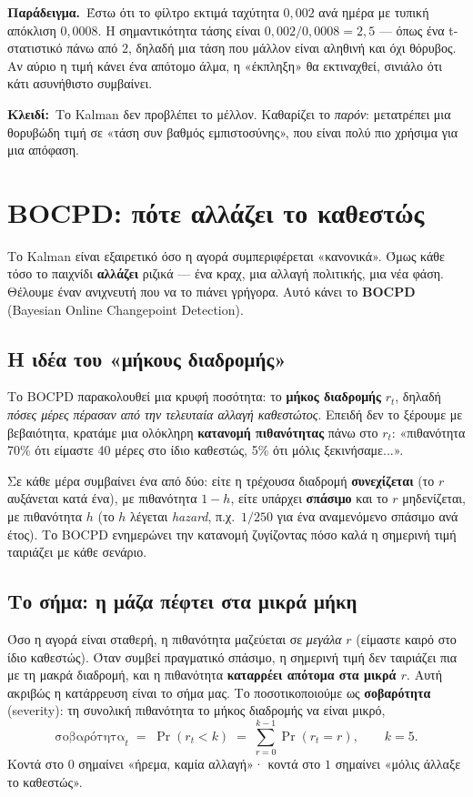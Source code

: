 \documentclass[11pt]{article}
\newcommand{\key}[1]{\par\medskip\noindent\colorbox{soft}{\parbox{\dimexpr\linewidth-2\fboxsep}{\textcolor{accent}{\textbf{Κλειδί:}}\ #1}}\par\medskip}
\newcommand{\ex}[1]{\par\smallskip\noindent\textbf{\textcolor{accent}{Παράδειγμα.}}\ #1\par\smallskip}
\begin{document}
\ex{Έστω ότι το φίλτρο εκτιμά ταχύτητα $0{,}002$ ανά ημέρα με τυπική απόκλιση $0{,}0008$. Η
σημαντικότητα τάσης είναι $0{,}002/0{,}0008 = 2{,}5$ --- όπως ένα t-στατιστικό πάνω από $2$, δηλαδή μια
τάση που μάλλον είναι αληθινή και όχι θόρυβος. Αν αύριο η τιμή κάνει ένα απότομο άλμα, η «έκπληξη» θα
εκτιναχθεί, σινιάλο ότι κάτι ασυνήθιστο συμβαίνει.}

\key{Το Kalman δεν προβλέπει το μέλλον. Καθαρίζει το \emph{παρόν}: μετατρέπει μια θορυβώδη τιμή σε
«τάση συν βαθμός εμπιστοσύνης», που είναι πολύ πιο χρήσιμα για μια απόφαση.}

\section{BOCPD: πότε αλλάζει το καθεστώς}

Το Kalman είναι εξαιρετικό όσο η αγορά συμπεριφέρεται «κανονικά». Όμως κάθε τόσο το παιχνίδι
\textbf{αλλάζει} ριζικά --- ένα κραχ, μια αλλαγή πολιτικής, μια νέα φάση. Θέλουμε έναν ανιχνευτή που να
το πιάνει γρήγορα. Αυτό κάνει το \textbf{BOCPD} (Bayesian Online Changepoint Detection).

\subsection{Η ιδέα του «μήκους διαδρομής»}
Το BOCPD παρακολουθεί μια κρυφή ποσότητα: το \textbf{μήκος διαδρομής} $r_t$, δηλαδή \emph{πόσες μέρες
πέρασαν από την τελευταία αλλαγή καθεστώτος}. Επειδή δεν το ξέρουμε με βεβαιότητα, κρατάμε μια ολόκληρη
\textbf{κατανομή πιθανότητας} πάνω στο $r_t$: «πιθανότητα 70\% ότι είμαστε 40 μέρες στο ίδιο καθεστώς,
5\% ότι μόλις ξεκινήσαμε...».

Σε κάθε μέρα συμβαίνει ένα από δύο: είτε η τρέχουσα διαδρομή \textbf{συνεχίζεται} (το $r$ αυξάνεται κατά
ένα), με πιθανότητα $1-h$, είτε υπάρχει \textbf{σπάσιμο} και το $r$ μηδενίζεται, με πιθανότητα $h$ (το
$h$ λέγεται \emph{hazard}, π.χ.\ $1/250$ για ένα αναμενόμενο σπάσιμο ανά έτος). Το BOCPD ενημερώνει την
κατανομή ζυγίζοντας πόσο καλά η σημερινή τιμή ταιριάζει με κάθε σενάριο.

\subsection{Το σήμα: η μάζα πέφτει στα μικρά μήκη}
Όσο η αγορά είναι σταθερή, η πιθανότητα μαζεύεται σε \emph{μεγάλα} $r$ (είμαστε καιρό στο ίδιο
καθεστώς). Όταν συμβεί πραγματικό σπάσιμο, η σημερινή τιμή δεν ταιριάζει πια με τη μακρά διαδρομή, και
η πιθανότητα \textbf{καταρρέει απότομα στα μικρά $r$}. Αυτή ακριβώς η κατάρρευση είναι το σήμα μας. Το
ποσοτικοποιούμε ως \textbf{σοβαρότητα} (severity): τη συνολική πιθανότητα το μήκος διαδρομής να είναι
μικρό,
\[
\text{σοβαρότητα}_t \;=\; \Pr(r_t < k) \;=\; \sum_{r=0}^{k-1}\Pr(r_t=r), \qquad k=5.
\]
Κοντά στο $0$ σημαίνει «ήρεμα, καμία αλλαγή»· κοντά στο $1$ σημαίνει «μόλις άλλαξε το καθεστώς».
\end{document}
